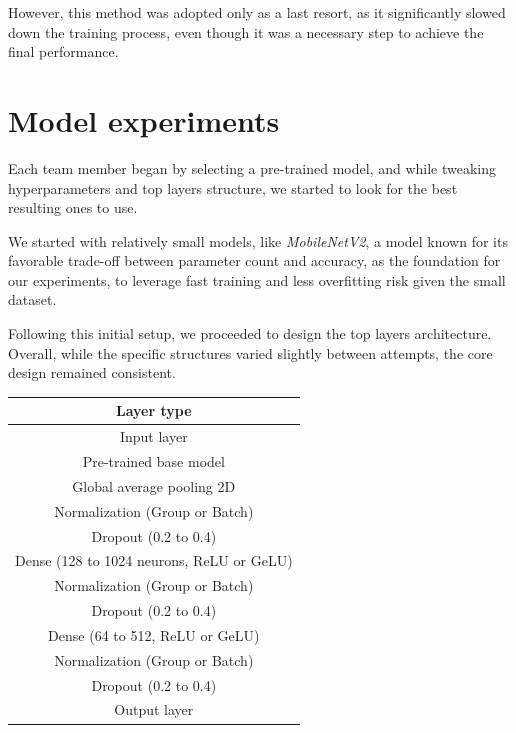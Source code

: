 \documentclass[11pt]{article}
\begin{document}
\begin{multicols}{2}
        However, this method was adopted only as a last resort, as it significantly slowed down the training process, even though it was a necessary step to achieve the final performance.
        
        \section{Model experiments}
        
        Each team member began by selecting a pre-trained model, and while tweaking hyperparameters and top layers structure, we started to look for the best resulting ones to use.
        
        We started with relatively small models, like \textit{MobileNetV2}, a model known for its favorable trade-off between parameter count and accuracy, as the foundation for our experiments, to leverage fast training and less overfitting risk given the small dataset.
        
        Following this initial setup, we proceeded to design the top layers architecture. 
        Overall, while the specific structures varied slightly between attempts, the core design remained consistent.
        
        \begin{table}[H]
            \centering
            \setlength{\tabcolsep}{5pt}
            \begin{tabular}{|c|}
                \hline
                \textbf{Layer type} \\ \hline
                Input layer \\ \hline
                Pre-trained base model \\ \hline
                Global average pooling 2D \\ \hline
                Normalization (Group or Batch) \\ \hline
                Dropout (0.2 to 0.4) \\ \hline
                Dense (128 to 1024 neurons, ReLU or GeLU) \\ \hline
                Normalization (Group or Batch) \\ \hline
                Dropout (0.2 to 0.4) \\ \hline
                Dense (64 to 512, ReLU or GeLU) \\ \hline
                Normalization (Group or Batch) \\ \hline
                Dropout (0.2 to 0.4) \\ \hline
                Output layer \\ \hline
            \end{tabular}
        \end{table}
        

\end{multicols}
\end{document}
